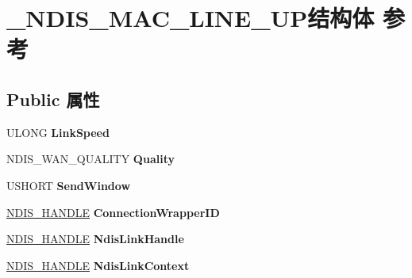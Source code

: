 \hypertarget{struct___n_d_i_s___m_a_c___l_i_n_e___u_p}{}\section{\+\_\+\+N\+D\+I\+S\+\_\+\+M\+A\+C\+\_\+\+L\+I\+N\+E\+\_\+\+U\+P结构体 参考}
\label{struct___n_d_i_s___m_a_c___l_i_n_e___u_p}
\subsection*{Public 属性}
\begin{DoxyCompactItemize}
\item 
\mbox{\label{struct___n_d_i_s___m_a_c___l_i_n_e___u_p_a65a38cd92b2f4547421373cc6cbeae17}} 
U\+L\+O\+NG {\bfseries Link\+Speed}
\item 
\mbox{\label{struct___n_d_i_s___m_a_c___l_i_n_e___u_p_aa14568f9a8bbb5acdd6bb4b385330fc2}} 
N\+D\+I\+S\+\_\+\+W\+A\+N\+\_\+\+Q\+U\+A\+L\+I\+TY {\bfseries Quality}
\item 
\mbox{\label{struct___n_d_i_s___m_a_c___l_i_n_e___u_p_a32f6f4a421d1176b4dfb9efe75bc23f9}} 
U\+S\+H\+O\+RT {\bfseries Send\+Window}
\item 
\mbox{\label{struct___n_d_i_s___m_a_c___l_i_n_e___u_p_aa20560abadc57d818d10d001a754ea4e}} 
\hyperlink{interfacevoid}{N\+D\+I\+S\+\_\+\+H\+A\+N\+D\+LE} {\bfseries Connection\+Wrapper\+ID}
\item 
\mbox{\label{struct___n_d_i_s___m_a_c___l_i_n_e___u_p_aec8c401515897f43a6f1d1f1badd056a}} 
\hyperlink{interfacevoid}{N\+D\+I\+S\+\_\+\+H\+A\+N\+D\+LE} {\bfseries Ndis\+Link\+Handle}
\item 
\mbox{\label{struct___n_d_i_s___m_a_c___l_i_n_e___u_p_ab98fa04abf6463670b62d1f7c94847c6}} 
\hyperlink{interfacevoid}{N\+D\+I\+S\+\_\+\+H\+A\+N\+D\+LE} {\bfseries Ndis\+Link\+Context}
\item 
\mbox{\label{struct___n_d_i_s___m_a_c___l_i_n_e___u_p_accc91c1da1a26bbd0dff24379754a643}} 

\end{DoxyCompactItemize}

